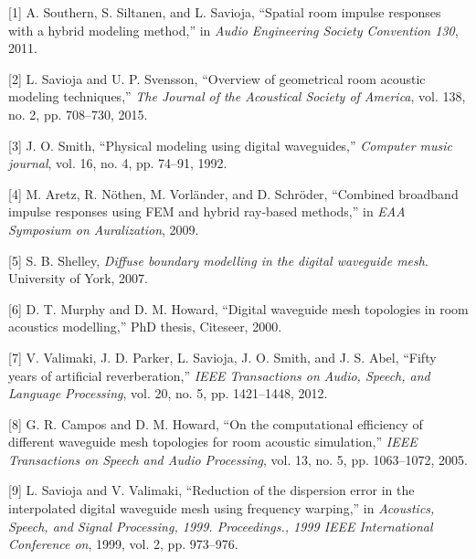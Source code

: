 \documentclass[]{scrreprt}
\begin{document}
\let\oldhypertarget\hypertarget

\renewcommand{\hypertarget}[2]{ \leavevmode \oldhypertarget{#1}{#2} }

\hypertarget{refs}{}
\hypertarget{ref-southernux5fspatialux5f2011}{}
{[}1{]} A. Southern, S. Siltanen, and L. Savioja, ``Spatial room impulse
responses with a hybrid modeling method,'' in \emph{Audio Engineering
Society Convention 130}, 2011.

\hypertarget{ref-saviojaux5foverviewux5f2015}{}
{[}2{]} L. Savioja and U. P. Svensson, ``Overview of geometrical room
acoustic modeling techniques,'' \emph{The Journal of the Acoustical
Society of America}, vol. 138, no. 2, pp. 708--730, 2015.

\hypertarget{ref-smithux5fphysicalux5f1992}{}
{[}3{]} J. O. Smith, ``Physical modeling using digital waveguides,''
\emph{Computer music journal}, vol. 16, no. 4, pp. 74--91, 1992.

\hypertarget{ref-aretzux5fcombinedux5f2009}{}
{[}4{]} M. Aretz, R. Nöthen, M. Vorländer, and D. Schröder, ``Combined
broadband impulse responses using FEM and hybrid ray-based methods,'' in
\emph{EAA Symposium on Auralization}, 2009.

\hypertarget{ref-shelleyux5fdiffuseux5f2007}{}
{[}5{]} S. B. Shelley, \emph{Diffuse boundary modelling in the digital
waveguide mesh}. University of York, 2007.

\hypertarget{ref-murphyux5fdigitalux5f2000}{}
{[}6{]} D. T. Murphy and D. M. Howard, ``Digital waveguide mesh
topologies in room acoustics modelling,'' PhD thesis, Citeseer, 2000.

\hypertarget{ref-valimakiux5ffiftyux5f2012}{}
{[}7{]} V. Valimaki, J. D. Parker, L. Savioja, J. O. Smith, and J. S.
Abel, ``Fifty years of artificial reverberation,'' \emph{IEEE
Transactions on Audio, Speech, and Language Processing}, vol. 20, no. 5,
pp. 1421--1448, 2012.

\hypertarget{ref-camposux5fcomputationalux5f2005}{}
{[}8{]} G. R. Campos and D. M. Howard, ``On the computational efficiency
of different waveguide mesh topologies for room acoustic simulation,''
\emph{IEEE Transactions on Speech and Audio Processing}, vol. 13, no. 5,
pp. 1063--1072, 2005.

\hypertarget{ref-saviojaux5freductionux5f1999}{}
{[}9{]} L. Savioja and V. Valimaki, ``Reduction of the dispersion error
in the interpolated digital waveguide mesh using frequency warping,'' in
\emph{Acoustics, Speech, and Signal Processing, 1999. Proceedings., 1999
IEEE International Conference on}, 1999, vol. 2, pp. 973--976.
\end{document}
